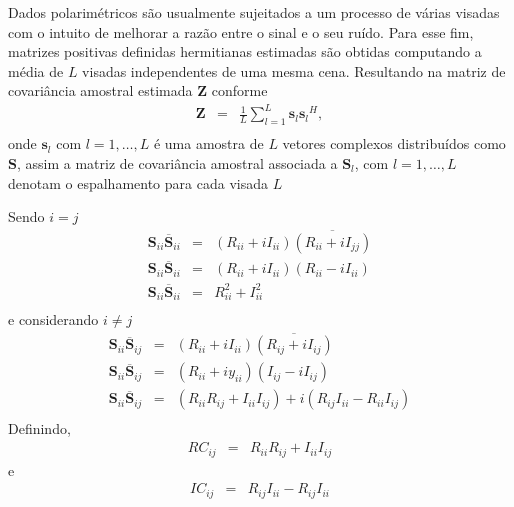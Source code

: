 Dados polarimétricos são usualmente sujeitados a um processo de várias visadas com o intuito de melhorar a razão entre o sinal e o seu ruído. Para esse fim, matrizes positivas definidas hermitianas estimadas são obtidas computando a média de $L$ visadas independentes de uma mesma cena. Resultando na matriz de covariância amostral estimada {\bf Z} conforme \cite{good, ade}
\begin{equation}
\begin{array}{ccc}
    \mathbf{Z}&=&\frac{1}{L}\displaystyle{\sum_{l=1}^{L} {\mathbf{s}_l}{\mathbf{s}_l}^H}, \\
\end{array}
\end{equation}
onde $\mathbf{s}_l$ com $l = 1, \dots, L$ é uma amostra de $\mathit{L}$ vetores complexos distribuídos como $\mathbf{S}$, assim a matriz de covariância amostral associada a $\mathbf{S}_l$, com $l=1,\dots,L$ denotam o espalhamento para cada visada $L$

Sendo $i=j$
\begin{equation}
\begin{array}{ccc}
\mathbf{S}_{ii}\overline{\mathbf{S}}_{ii}&=& (R_{ii}+iI_{ii})\overline{(R_{ii}+iI_{jj})} \\
\mathbf{S}_{ii}\overline{\mathbf{S}}_{ii}&=& (R_{ii}+iI_{ii})(R_{ii}-iI_{ii}) \\
\mathbf{S}_{ii}\overline{\mathbf{S}}_{ii}&=& R_{ii}^2+I_{ii}^2 \\
\end{array}
\end{equation}
e considerando $i \neq j$
\begin{equation}
\begin{array}{ccc}
\mathbf{S}_{ii}\overline{\mathbf{S}}_{ij}&=& (R_{ii}+iI_{ii})\overline{(R_{ij}+iI_{ij})} \\
\mathbf{S}_{ii}\overline{\mathbf{S}}_{ij}&=& (R_{ii}+iy_{ii})(I_{ij}-iI_{ij}) \\
\mathbf{S}_{ii}\overline{\mathbf{S}}_{ij}&=& (R_{ii}R_{ij}+I_{ii}I_{ij})+i(R_{ij}I_{ii}-R_{ii}I_{ij}) \\
\end{array}
\end{equation}
 Definindo,
 \begin{equation}
\begin{array}{ccc}
	  RC_{ij}&=&  R_{ii}R_{ij}+I_{ii}I_{ij} 
\end{array}
\end{equation}
e
\begin{equation}
\begin{array}{ccc}
	  IC_{ij}&=& R_{ij}I_{ii}-R_{ij}I_{ii}
\end{array}
\end{equation}

